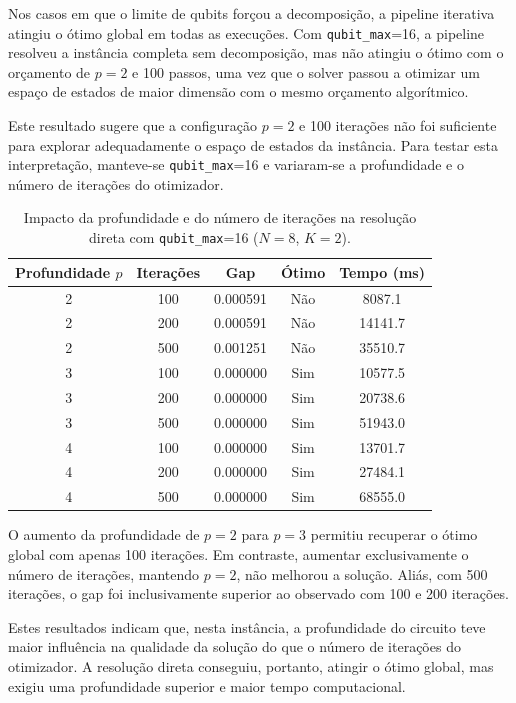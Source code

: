 Nos casos em que o limite de qubits forçou a decomposição, a pipeline iterativa atingiu o ótimo global em todas as execuções. Com \texttt{qubit\_max}=16,
a pipeline resolveu a instância completa sem decomposição, mas não atingiu o ótimo com
o orçamento de $p=2$ e 100 passos, uma vez que o solver passou a otimizar um espaço
de estados de maior dimensão com o mesmo orçamento algorítmico.

Este resultado sugere que a configuração $p=2$ e 100 iterações não foi suficiente
para explorar adequadamente o espaço de estados da instância. Para testar
esta interpretação, manteve-se \texttt{qubit\_max}=16 e variaram-se a profundidade
e o número de iterações do otimizador.

\begin{table}[H]
\centering
\begin{tabular}{|c|c|c|c|c|}
\hline
\textbf{Profundidade $p$} &
\textbf{Iterações} &
\textbf{Gap} &
\textbf{Ótimo} &
\textbf{Tempo (ms)} \\
\hline
2 & 100 & 0.000591 & Não & 8087.1  \\
2 & 200 & 0.000591 & Não & 14141.7 \\
2 & 500 & 0.001251 & Não & 35510.7 \\
\hline
3 & 100 & 0.000000 & Sim & 10577.5 \\
3 & 200 & 0.000000 & Sim & 20738.6 \\
3 & 500 & 0.000000 & Sim & 51943.0 \\
\hline
4 & 100 & 0.000000 & Sim & 13701.7 \\
4 & 200 & 0.000000 & Sim & 27484.1 \\
4 & 500 & 0.000000 & Sim & 68555.0 \\
\hline
\end{tabular}
\caption{Impacto da profundidade e do número de iterações na resolução direta
com \texttt{qubit\_max}=16 ($N=8$, $K=2$).}
\label{tab:resultados-profundidade-passos-direta}
\end{table}
O aumento da profundidade de $p=2$ para $p=3$ permitiu recuperar o ótimo global
com apenas 100 iterações. Em contraste, aumentar exclusivamente o número de
iterações, mantendo $p=2$, não melhorou a solução. Aliás, com 500 iterações, o gap foi
inclusivamente superior ao observado com 100 e 200 iterações.

Estes resultados indicam que, nesta instância, a profundidade do circuito teve
maior influência na qualidade da solução do que o número de iterações do
otimizador. A resolução direta conseguiu, portanto, atingir o ótimo global, mas
exigiu uma profundidade superior e maior tempo computacional.

